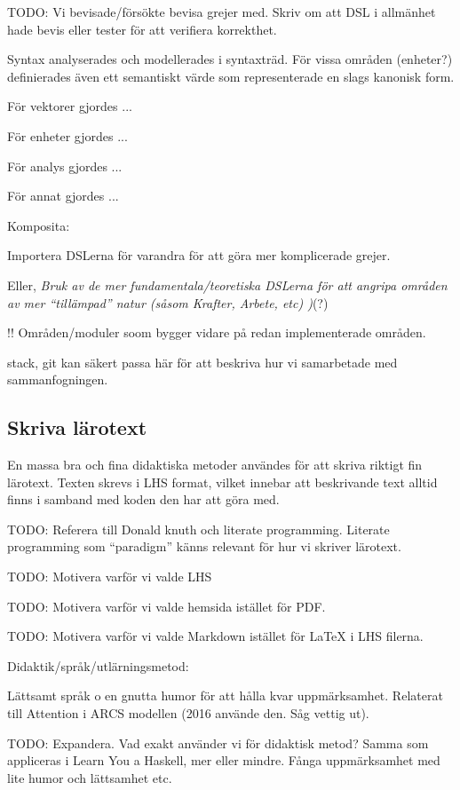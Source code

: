 \begin{binge}
    TODO: Vi bevisade/försökte bevisa grejer med. Skriv om att DSL i
    allmänhet hade bevis eller tester för att verifiera korrekthet.


  Syntax analyserades och modellerades i syntaxträd. För vissa områden
  (enheter?) definierades även ett semantiskt värde som representerade
  en slags kanonisk form.

  För vektorer gjordes ...

  För enheter gjordes ...

  För analys gjordes ...

  För annat gjordes ...

  Komposita:

  Importera DSLerna för varandra för att göra mer komplicerade grejer.

  Eller, \emph{Bruk av de mer fundamentala/teoretiska DSLerna för att
    angripa områden av mer ``tillämpad'' natur (såsom Krafter, Arbete,
    etc) )}(?)

  !! Områden/moduler soom bygger vidare på redan implementerade områden.

  stack, git kan säkert passa här för att beskriva hur vi samarbetade
  med sammanfogningen.




  \subsection{Skriva lärotext}

  En massa bra och fina didaktiska metoder användes för att skriva
  riktigt fin lärotext. Texten skrevs i LHS format, vilket innebar att
  beskrivande text alltid finns i samband med koden den har att göra
  med.

  TODO: Referera till Donald knuth och literate programming. Literate
  programming som ``paradigm'' känns relevant för hur vi skriver
  lärotext.

  TODO: Motivera varför vi valde LHS

  TODO: Motivera varför vi valde hemsida istället för PDF.

  TODO: Motivera varför vi valde Markdown istället för LaTeX i LHS
  filerna.

  Didaktik/språk/utlärningsmetod:

  Lättsamt språk o en gnutta humor för att hålla kvar
  uppmärksamhet. Relaterat till Attention i ARCS modellen (2016
  använde den. Såg vettig ut).

  TODO: Expandera. Vad exakt använder vi för didaktisk metod? Samma
  som appliceras i Learn You a Haskell, mer eller mindre. Fånga
  uppmärksamhet med lite humor och lättsamhet etc.


\end{binge}
